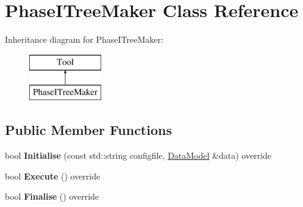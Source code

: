 \hypertarget{classPhaseITreeMaker}{\section{Phase\-I\-Tree\-Maker Class Reference}
\label{classPhaseITreeMaker}
}
Inheritance diagram for Phase\-I\-Tree\-Maker\-:\begin{figure}[H]
\begin{center}
\leavevmode
\includegraphics[height=2.000000cm]{classPhaseITreeMaker}
\end{center}
\end{figure}
\subsection*{Public Member Functions}
\begin{DoxyCompactItemize}
\item 
\hypertarget{classPhaseITreeMaker_aa12e20838522941f6a22633bab68f670}{bool {\bfseries Initialise} (const std\-::string configfile, \hyperlink{classDataModel}{Data\-Model} \&data) override}\label{classPhaseITreeMaker_aa12e20838522941f6a22633bab68f670}

\item 
\hypertarget{classPhaseITreeMaker_ad5fc39011665bc920d1f87fdf3315b0c}{bool {\bfseries Execute} () override}\label{classPhaseITreeMaker_ad5fc39011665bc920d1f87fdf3315b0c}

\item 
\hypertarget{classPhaseITreeMaker_a1e910bcd77869d96213501d25a5074ca}{bool {\bfseries Finalise} () override}\label{classPhaseITreeMaker_a1e910bcd77869d96213501d25a5074ca}

\end{DoxyCompactItemize}
